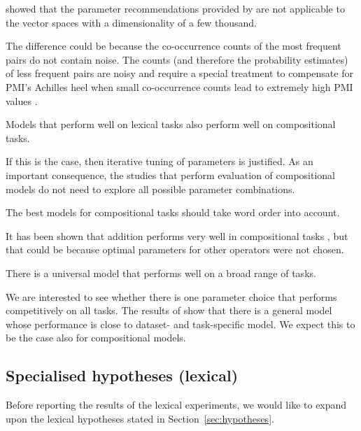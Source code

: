  showed that the parameter recommendations provided by  are not applicable to the vector spaces with a dimensionality of a few thousand.

The difference could be because the co-occurrence counts of the most frequent pairs do not contain noise. The counts (and therefore the probability estimates) of less frequent pairs are noisy and require a special treatment to compensate for PMI's Achilles heel when small co-occurrence counts lead to extremely high PMI values \cite{TACL570}.

\begin{hyp}
\label{hyp:not-lextocomp}
Models that perform well on lexical tasks also perform well on compositional tasks.
\end{hyp}

If this is the case, then iterative tuning of parameters is justified. As an important consequence, the studies that perform evaluation of compositional models do not need to explore all possible parameter combinations.

\begin{hyp}
\label{hyp:order}
The best models for compositional tasks should take word order into account.
\end{hyp}

It has been shown that addition performs very well in compositional tasks \cite{milajevs-EtAl:2014:EMNLP2014}, but that could be because optimal parameters for other operators were not chosen.

\begin{hyp}
\label{hyp:universal}
There is a universal model that performs well on a broad range of tasks.
\end{hyp}

We are interested to see whether there is one parameter choice that performs competitively on all tasks. The results of \citet{lapesa2014large} show that there is a general model whose performance is close to dataset- and task-specific model. We expect this to be the case also for compositional models.

\subsection{Specialised hypotheses (lexical)}
\label{sec:elab-hypoth-lexical}

Before reporting the results of the lexical experiments, we would like to expand upon the lexical hypotheses stated in Section~\ref{sec:hypotheses}.

